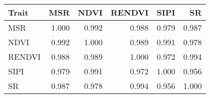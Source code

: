 \captionsetup[table]{labelformat=empty,skip=1pt}
\begin{longtable}{lrrrrr}
\toprule
Trait & MSR & NDVI & RENDVI & SIPI & SR \\ 
\midrule
MSR & 1.000 & 0.992 & 0.988 & 0.979 & 0.987 \\ 
NDVI & 0.992 & 1.000 & 0.989 & 0.991 & 0.978 \\ 
RENDVI & 0.988 & 0.989 & 1.000 & 0.972 & 0.994 \\ 
SIPI & 0.979 & 0.991 & 0.972 & 1.000 & 0.956 \\ 
SR & 0.987 & 0.978 & 0.994 & 0.956 & 1.000 \\ 
\bottomrule
\end{longtable}

